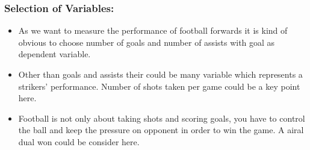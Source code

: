 \documentclass[12pt]{article}
\begin{document}
\subsubsection*{Selection of Variables:}
\begin{itemize}
	\item As we want to measure the performance of football forwards it is kind of obvious to choose number of goals and number of assists with goal as dependent variable.
	\item Other than goals and assists their could be many variable which represents a strikers' performance. Number of shots taken per game could be a key point here.
	\item Football is not only about taking shots and scoring goals, you have to control the ball and keep the pressure on opponent in order to win the game. A airal dual won could be consider here. 

\end{itemize}
\end{document}
